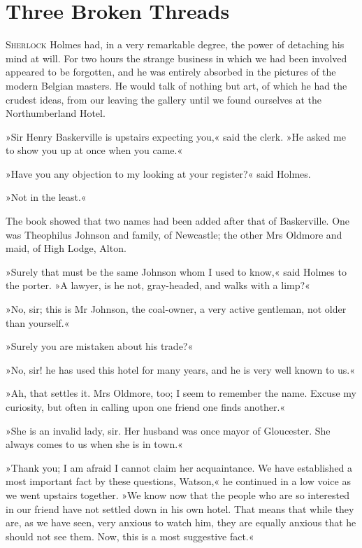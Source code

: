 \chapter{Three Broken Threads}
\lettrine[lines=4]{S}{herlock} Holmes had, in a very remarkable degree, the power of detaching his mind at will. For two hours the strange business in which we had been involved appeared to be forgotten, and he was entirely absorbed in the pictures of the modern Belgian masters. He would talk of nothing but art, of which he had the crudest ideas, from our leaving the gallery until we found ourselves at the Northumberland Hotel.

»Sir Henry Baskerville is upstairs expecting you,« said the clerk. »He asked me to show you up at once when you came.«

»Have you any objection to my looking at your register?« said Holmes.

»Not in the least.«

The book showed that two names had been added after that of Baskerville. One was Theophilus Johnson and family, of Newcastle; the other Mrs Oldmore and maid, of High Lodge, Alton.

»Surely that must be the same Johnson whom I used to know,« said Holmes to the porter. »A lawyer, is he not, gray-headed, and walks with a limp?«

»No, sir; this is Mr Johnson, the coal-owner, a very active gentleman, not older than yourself.«

»Surely you are mistaken about his trade?«

»No, sir! he has used this hotel for many years, and he is very well known to us.«

»Ah, that settles it. Mrs Oldmore, too; I seem to remember the name. Excuse my curiosity, but often in calling upon one friend one finds another.«

»She is an invalid lady, sir. Her husband was once mayor of Gloucester. She always comes to us when she is in town.«

»Thank you; I am afraid I cannot claim her acquaintance. We have established a most important fact by these questions, Watson,« he continued in a low voice as we went upstairs together. »We know now that the people who are so interested in our friend have not settled down in his own hotel. That means that while they are, as we have seen, very anxious to watch him, they are equally anxious that he should not see them. Now, this is a most suggestive fact.«

